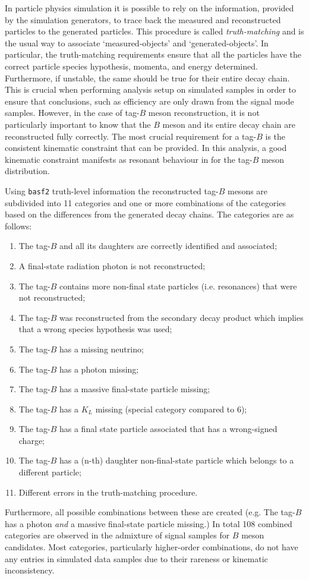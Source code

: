In particle physics simulation it is possible to rely on the information, provided by the simulation generators, to trace back the measured and reconstructed particles to the generated particles.
This procedure is called \textit{truth-matching} and is the usual way to associate `measured-objects' and `generated-objects'.
In particular, the truth-matching requirements ensure that all the particles have the correct particle species hypothesis, momenta, and energy determined.
Furthermore, if unstable, the same should be true for their entire decay chain.
This is crucial when performing analysis setup on simulated samples in order to ensure that conclusions, such as efficiency are only drawn from the signal mode samples.
However, in the case of tag-$B$ meson reconstruction, it is not particularly important to know that the $B$ meson and its entire decay chain are reconstructed fully correctly.
The most crucial requirement for a tag-$B$ is the consistent kinematic constraint that can be provided.
In this analysis, a good kinematic constraint manifests as resonant behaviour in \Mbc for the tag-$B$ meson distribution.

Using \texttt{basf2} truth-level information the reconstructed tag-$B$ mesons are subdivided into 11 categories and one or more combinations of the categories based on the differences from the generated decay chains.
The categories are as follows:
\begin{enumerate}
    \setcounter{enumi}{0}
    \item The tag-$B$ and all its daughters are correctly identified and associated;
    \item A final-state radiation photon is not reconstructed;
    \item The tag-$B$ contains more non-final state particles (i.e. resonances) that were not reconstructed;
    \item The tag-$B$ was reconstructed from the secondary decay product which implies that a wrong species hypothesis was used;
    \item The tag-$B$ has a missing neutrino;
    \item The tag-$B$ has a photon missing;
    \item The tag-$B$ has a massive final-state particle missing;
    \item The tag-$B$ has a $K_L$ missing (special category compared to 6);
    \item The tag-$B$ has a final state particle associated that has a wrong-signed charge;
    \item The tag-$B$ has a (n-th) daughter non-final-state particle which belongs to a different particle;
    \item Different errors in the truth-matching procedure.
\end{enumerate}
Furthermore, all possible combinations between these are created (e.g. The tag-$B$ has a photon \textit{and} a massive final-state particle missing.)
In total 108 combined categories are observed in the admixture of \BtoXsgamma signal \MC samples for $B$ meson candidates.
Most categories, particularly higher-order combinations, do not have any entries in simulated data samples due to their rareness or kinematic inconsistency.

